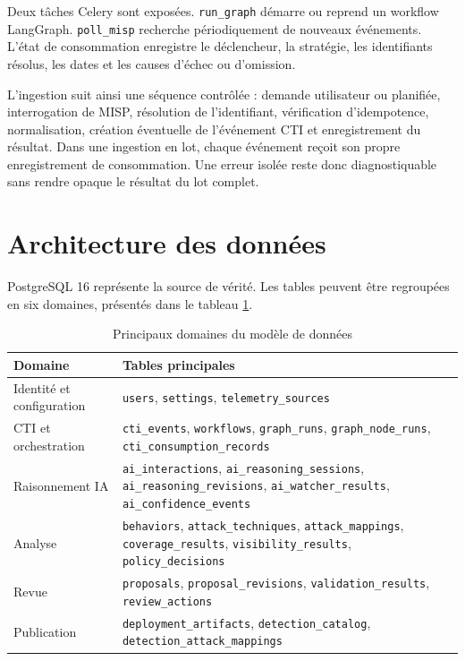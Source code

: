 Deux tâches Celery sont exposées. \texttt{run\_graph} démarre ou reprend un workflow LangGraph. \texttt{poll\_misp} recherche périodiquement de nouveaux événements. L'état de consommation enregistre le déclencheur, la stratégie, les identifiants résolus, les dates et les causes d'échec ou d'omission.

L'ingestion suit ainsi une séquence contrôlée : demande utilisateur ou planifiée, interrogation de MISP, résolution de l'identifiant, vérification d'idempotence, normalisation, création éventuelle de l'événement CTI et enregistrement du résultat. Dans une ingestion en lot, chaque événement reçoit son propre enregistrement de consommation. Une erreur isolée reste donc diagnostiquable sans rendre opaque le résultat du lot complet.

\section{Architecture des données}

PostgreSQL 16 représente la source de vérité. Les tables peuvent être regroupées en six domaines, présentés dans le tableau \ref{tab:domaines-donnees}.

\begin{table}[htbp]
\centering
\caption{Principaux domaines du modèle de données}
\label{tab:domaines-donnees}
\begin{tabular}{|p{}|p{}|}
\hline
\rowcolor[gray]{0.8}\textbf{Domaine} & \textbf{Tables principales} \\
\hline
Identité et configuration & \texttt{users}, \texttt{settings}, \texttt{telemetry\_sources} \\
\hline
CTI et orchestration & \texttt{cti\_events}, \texttt{workflows}, \texttt{graph\_runs}, \texttt{graph\_node\_runs}, \texttt{cti\_consumption\_records} \\
\hline
Raisonnement IA & \texttt{ai\_interactions}, \texttt{ai\_reasoning\_sessions}, \texttt{ai\_reasoning\_revisions}, \texttt{ai\_watcher\_results}, \texttt{ai\_confidence\_events} \\
\hline
Analyse & \texttt{behaviors}, \texttt{attack\_techniques}, \texttt{attack\_mappings}, \texttt{coverage\_results}, \texttt{visibility\_results}, \texttt{policy\_decisions} \\
\hline
Revue & \texttt{proposals}, \texttt{proposal\_revisions}, \texttt{validation\_results}, \texttt{review\_actions} \\
\hline
Publication & \texttt{deployment\_artifacts}, \texttt{detection\_catalog}, \texttt{detection\_attack\_mappings} \\
\hline
\end{tabular}
\end{table}

